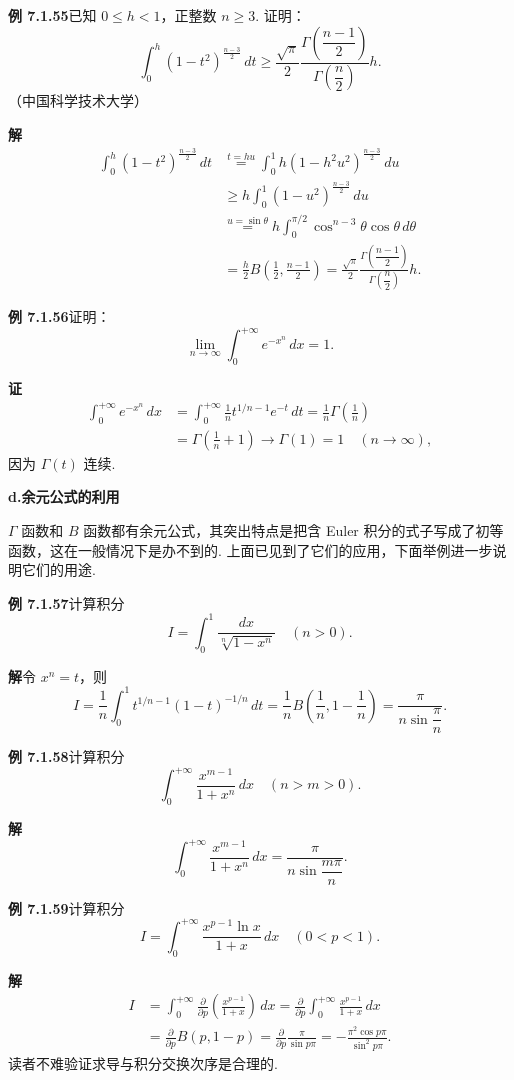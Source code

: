 \documentclass[UTF8, 12pt, fontset=fandol, oneside]{ctexart}
\begin{document}
\noindent\textbf{例 7.1.55}\quad 已知 $0\le h<1$，正整数 $n\ge3$. 证明：
\[
\int_0^h(1-t^2)^{\frac{n-3}{2}}\,dt
\ge \frac{\sqrt\pi}{2}\frac{\Gamma\left(\dfrac{n-1}{2}\right)}
{\Gamma\left(\dfrac n2\right)}h.
\]
（中国科学技术大学）

\noindent\textbf{解}\quad
\[
\begin{aligned}
\int_0^h(1-t^2)^{\frac{n-3}{2}}\,dt
&\overset{t=hu}{=}\int_0^1h(1-h^2u^2)^{\frac{n-3}{2}}\,du\\
&\ge h\int_0^1(1-u^2)^{\frac{n-3}{2}}\,du\\
&\overset{u=\sin\theta}{=}h\int_0^{\pi/2}\cos^{n-3}\theta\cos\theta\,d\theta\\
&=\frac h2 B\left(\frac12,\frac{n-1}{2}\right)
=\frac{\sqrt\pi}{2}\frac{\Gamma\left(\dfrac{n-1}{2}\right)}
{\Gamma\left(\dfrac n2\right)}h.
\end{aligned}
\]

\noindent\textbf{例 7.1.56}\quad 证明：
\[
\lim_{n\to\infty}\int_0^{+\infty}e^{-x^n}\,dx=1.
\]

\noindent\textbf{证}\quad
\[
\begin{aligned}
\int_0^{+\infty}e^{-x^n}\,dx
&=\int_0^{+\infty}\frac1n t^{1/n-1}e^{-t}\,dt
=\frac1n\Gamma\left(\frac1n\right)\\
&=\Gamma\left(\frac1n+1\right)\to\Gamma(1)=1\quad(n\to\infty),
\end{aligned}
\]
因为 $\Gamma(t)$ 连续.

\noindent\textbf{d.\quad 余元公式的利用}

$\Gamma$ 函数和 $B$ 函数都有余元公式，其突出特点是把含 Euler 积分的式子写成了初等函数，这在一般情况下是办不到的. 上面已见到了它们的应用，下面举例进一步说明它们的用途.

\noindent\textbf{例 7.1.57}\quad 计算积分
\[
I=\int_0^1\frac{dx}{\sqrt[n]{1-x^n}}\quad(n>0).
\]

\noindent\textbf{解}\quad 令 $x^n=t$，则
\[
I=\frac1n\int_0^1t^{1/n-1}(1-t)^{-1/n}\,dt
=\frac1nB\left(\frac1n,1-\frac1n\right)
=\frac{\pi}{n\sin\dfrac\pi n}.
\]

\noindent\textbf{例 7.1.58}\quad 计算积分
\[
\int_0^{+\infty}\frac{x^{m-1}}{1+x^n}\,dx\quad(n>m>0).
\]

\noindent\textbf{解}\quad
\[
\int_0^{+\infty}\frac{x^{m-1}}{1+x^n}\,dx
=\frac{\pi}{n\sin\dfrac{m\pi}{n}}.
\]

\noindent\textbf{例 7.1.59}\quad 计算积分
\[
I=\int_0^{+\infty}\frac{x^{p-1}\ln x}{1+x}\,dx\quad(0<p<1).
\]

\noindent\textbf{解}\quad
\[
\begin{aligned}
I&=\int_0^{+\infty}\frac{\partial}{\partial p}\left(\frac{x^{p-1}}{1+x}\right)\,dx
=\frac{\partial}{\partial p}\int_0^{+\infty}\frac{x^{p-1}}{1+x}\,dx\\
&=\frac{\partial}{\partial p}B(p,1-p)
=\frac{\partial}{\partial p}\frac{\pi}{\sin p\pi}
=-\frac{\pi^2\cos p\pi}{\sin^2p\pi}.
\end{aligned}
\]
读者不难验证求导与积分交换次序是合理的.
\end{document}
